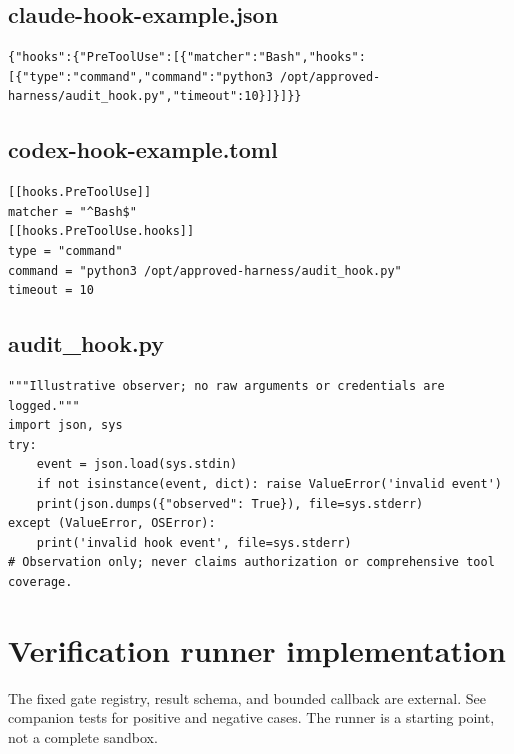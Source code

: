 \documentclass[11pt,letterpaper]{article}
\begin{document}
\subsection*{claude-hook-example.json}
\begin{lstlisting}
{"hooks":{"PreToolUse":[{"matcher":"Bash","hooks":[{"type":"command","command":"python3 /opt/approved-harness/audit_hook.py","timeout":10}]}]}}
\end{lstlisting}
\subsection*{codex-hook-example.toml}
\begin{lstlisting}
[[hooks.PreToolUse]]
matcher = "^Bash$"
[[hooks.PreToolUse.hooks]]
type = "command"
command = "python3 /opt/approved-harness/audit_hook.py"
timeout = 10
\end{lstlisting}
\subsection*{audit\_hook.py}
\begin{lstlisting}
"""Illustrative observer; no raw arguments or credentials are logged."""
import json, sys
try:
    event = json.load(sys.stdin)
    if not isinstance(event, dict): raise ValueError('invalid event')
    print(json.dumps({"observed": True}), file=sys.stderr)
except (ValueError, OSError):
    print('invalid hook event', file=sys.stderr)
# Observation only; never claims authorization or comprehensive tool coverage.
\end{lstlisting}
\clearpage\section{Verification runner implementation}
The fixed gate registry, result schema, and bounded callback are external. See companion tests for positive and negative cases. The runner is a starting point, not a complete sandbox.
\end{document}
